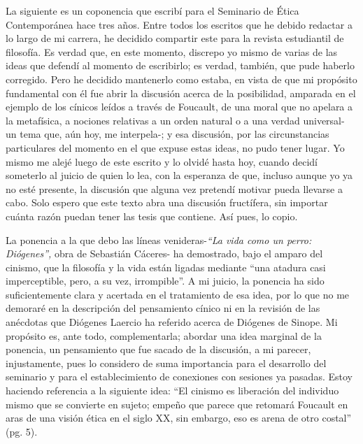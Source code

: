 
\begin{refsection}

La siguiente es un coponencia que escribí para el Seminario de Ética Contemporánea hace tres años. Entre todos los escritos que he debido redactar a lo largo de mi carrera, he decidido compartir este para la revista estudiantil de filosofía. Es verdad que, en este momento, discrepo yo mismo de varias de las ideas que defendí al momento de escribirlo; es verdad, también, que pude haberlo corregido. Pero he decidido mantenerlo como estaba, en vista de que mi propósito fundamental con él fue abrir la discusión acerca de la posibilidad, amparada en el ejemplo de los cínicos leídos a través de Foucault, de una moral que no apelara a la metafísica, a nociones relativas a un orden natural o a una verdad universal- un tema que, aún hoy, me interpela-; y esa discusión, por las circunstancias particulares del momento en el que expuse estas ideas, no pudo tener lugar. Yo mismo me alejé luego de este escrito y lo olvidé hasta hoy, cuando decidí someterlo al juicio de quien lo lea, con la esperanza de que, incluso aunque yo ya no esté presente, la discusión que alguna vez pretendí motivar pueda llevarse a cabo. Solo espero que este texto abra una discusión fructífera, sin importar cuánta razón puedan tener las tesis que contiene. Así pues, lo copio.

La ponencia a la que debo las líneas venideras-\emph{``La vida como un perro: Diógenes'',} obra de Sebastián Cáceres- ha demostrado, bajo el amparo del cinismo, que la filosofía y la vida están ligadas mediante ``una atadura casi imperceptible, pero, a su vez, irrompible''. A mi juicio, la ponencia ha sido suficientemente clara y acertada en el tratamiento de esa idea, por lo que no me demoraré en la descripción del pensamiento cínico ni en la revisión de las anécdotas que Diógenes Laercio ha referido acerca de Diógenes de Sinope. Mi propósito es, ante todo, complementarla; abordar una idea marginal de la ponencia, un pensamiento que fue sacado de la discusión, a mi parecer, injustamente, pues lo considero de suma importancia para el desarrollo del seminario y para el establecimiento de conexiones con sesiones ya pasadas. Estoy haciendo referencia a la siguiente idea: ``El cinismo es liberación del individuo mismo que se convierte en sujeto; empeño que parece que retomará Foucault en aras de una visión ética en el siglo XX, sin embargo, eso es arena de otro costal'' (pg. 5).


\end{refsection}
